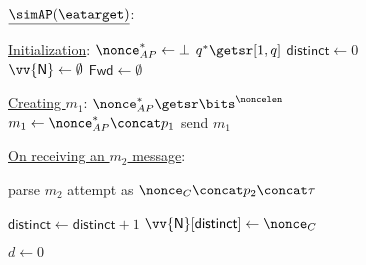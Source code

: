 \begin{figure}
\begin{adjustbox}{margin*=2ex,width=0.997\textwidth,frame,center}
\begin{minipage}[t]{0.53\textwidth}
\begin{algorithmic}[1]
			\end{algorithmic}
	\end{minipage}
	\begin{minipage}[t]{0.5\textwidth}
			$\underline{\simAP(\eatarget)}$: 
			\begin{algorithmic}[1]
				\setcounter{ALG@line}{99}
				\State \underline{Initialization}: \label{code:simAP:line:init_start}
				\Indent
					\State $\nonce_{AP}^* \gets \bot$
					\State $q^* \getsr [1, q]$ \label{code:simAP:line:init_end}
					\State $\mathsf{distinct} \gets 0$
					\State $\vv{\mathsf{N}} \gets \emptyset$
					\State $\mathsf{Fwd} \gets \emptyset$
				\EndIndent
					
				\Statex
				
				\setcounter{ALG@line}{199}
				\State \underline{Creating $m_1$}: \label{code:simAP:line:m_1_start}
				\Indent
					\State $\nonce_{AP}^* \getsr \bits^\noncelen$
					\State $m_1 \gets \nonce_{AP}^* \concat p_1$
					\State send $m_1$ \label{code:simAP:line:m_1_end}
				\EndIndent
				

				
				
				\Statex
				
				\setcounter{ALG@line}{299}
				\State \underline{On receiving an $m_2$ message}: \label{code:simAP:line:m_2_start}
				
				\Indent
					\State parse $m_2$ attempt as $\nonce_C \concat p_2 \concat \tau$
					
					\State
						\State $\mathsf{distinct} \gets \mathsf{distinct} + 1$
						\State $\vv{\mathsf{N}}[\mathsf{distinct}] \gets  \nonce_{C}$
							
					\EndIf
					
					\State
					\State $d \gets 0$ \label{code:simAP:line:d_bit_init}
										

\end{algorithmic}
\end{minipage}
\end{adjustbox}
\end{figure}
